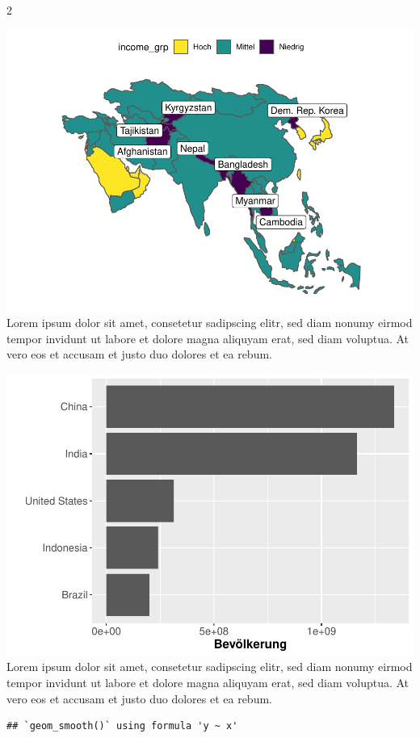 \documentclass[
]{article}
\begin{document}
\begin {multicols}{2}

\includegraphics{ggplot2_files/figure-latex/unnamed-chunk-6-1.pdf} Lorem
ipsum dolor sit amet, consetetur sadipscing elitr, sed diam nonumy
eirmod tempor invidunt ut labore et dolore magna aliquyam erat, sed diam
voluptua. At vero eos et accusam et justo duo dolores et ea rebum.
\columnbreak

\includegraphics{ggplot2_files/figure-latex/unnamed-chunk-7-1.pdf} Lorem
ipsum dolor sit amet, consetetur sadipscing elitr, sed diam nonumy
eirmod tempor invidunt ut labore et dolore magna aliquyam erat, sed diam
voluptua. At vero eos et accusam et justo duo dolores et ea rebum.

\end {multicols}

\begin{verbatim}
## `geom_smooth()` using formula 'y ~ x'
\end{verbatim}
\end{document}
